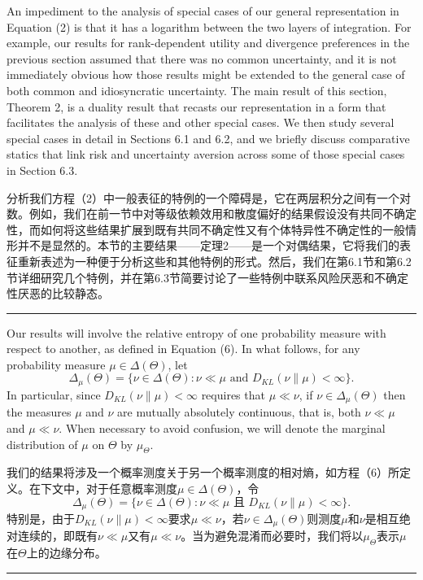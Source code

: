 \documentclass[12pt,a4paper]{article}
\newenvironment{original}
  {\par\noindent\color{black}\smallskip}
  {\par\smallskip}
\newenvironment{translation}
  {\par\noindent\color{blue!70!black}\smallskip}
  {\par\medskip\hrule\medskip}
\begin{document}
\begin{original}
An impediment to the analysis of special cases of our general representation in Equation (2) is that it has a logarithm between the two layers of integration. For example, our results for rank-dependent utility and divergence preferences in the previous section assumed that there was no common uncertainty, and it is not immediately obvious how those results might be extended to the general case of both common and idiosyncratic uncertainty. The main result of this section, Theorem 2, is a duality result that recasts our representation in a form that facilitates the analysis of these and other special cases. We then study several special cases in detail in Sections 6.1 and 6.2, and we briefly discuss comparative statics that link risk and uncertainty aversion across some of those special cases in Section 6.3.
\end{original}
\begin{translation}
分析我们方程（2）中一般表征的特例的一个障碍是，它在两层积分之间有一个对数。例如，我们在前一节中对等级依赖效用和散度偏好的结果假设没有共同不确定性，而如何将这些结果扩展到既有共同不确定性又有个体特异性不确定性的一般情形并不是显然的。本节的主要结果——定理2——是一个对偶结果，它将我们的表征重新表述为一种便于分析这些和其他特例的形式。然后，我们在第6.1节和第6.2节详细研究几个特例，并在第6.3节简要讨论了一些特例中联系风险厌恶和不确定性厌恶的比较静态。
\end{translation}

\begin{original}
Our results will involve the relative entropy of one probability measure with respect to another, as defined in Equation (6). In what follows, for any probability measure $\mu \in \Delta(\Theta)$, let
\[
\Delta_\mu(\Theta) = \{ \nu \in \Delta(\Theta) : \nu \ll \mu \text{ and } D_{KL}(\nu\|\mu) < \infty \}.
\]
In particular, since $D_{KL}(\nu\|\mu) < \infty$ requires that $\mu \ll \nu$, if $\nu \in \Delta_\mu(\Theta)$ then the measures $\mu$ and $\nu$ are mutually absolutely continuous, that is, both $\nu \ll \mu$ and $\mu \ll \nu$. When necessary to avoid confusion, we will denote the marginal distribution of $\mu$ on $\Theta$ by $\mu_\Theta$.
\end{original}
\begin{translation}
我们的结果将涉及一个概率测度关于另一个概率测度的相对熵，如方程（6）所定义。在下文中，对于任意概率测度$\mu \in \Delta(\Theta)$，令
\[
\Delta_\mu(\Theta) = \{ \nu \in \Delta(\Theta) : \nu \ll \mu \text{ 且 } D_{KL}(\nu\|\mu) < \infty \}.
\]
特别是，由于$D_{KL}(\nu\|\mu) < \infty$要求$\mu \ll \nu$，若$\nu \in \Delta_\mu(\Theta)$则测度$\mu$和$\nu$是相互绝对连续的，即既有$\nu \ll \mu$又有$\mu \ll \nu$。当为避免混淆而必要时，我们将以$\mu_\Theta$表示$\mu$在$\Theta$上的边缘分布。
\end{translation}
\end{document}
